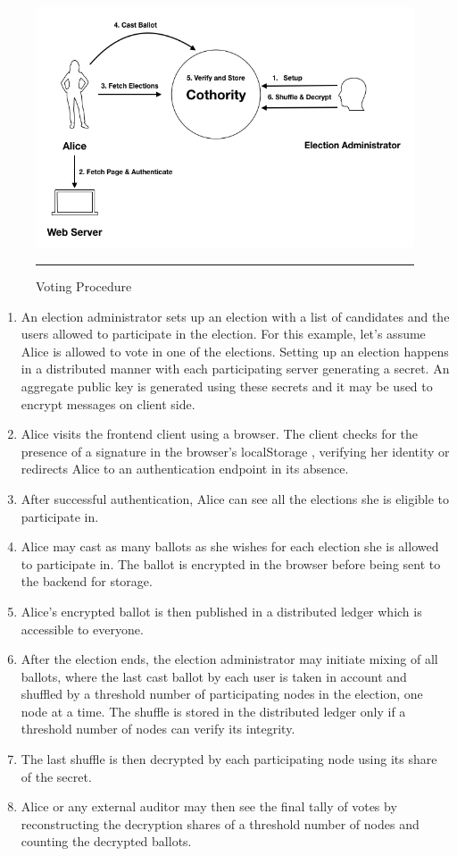 \begin{figure}[htpb]
  \centering
    \includegraphics[scale=0.4]{Figures/Overview.png}
    \rule{35em}{0.5pt}
  \caption[Voting Procedure]{Voting Procedure}
  \label{fig:Voting Procedure}
\end{figure}

\begin{enumerate}
\item An election administrator sets up an election with a list of candidates and the users allowed to participate in the election. For this example, let's assume Alice is allowed to vote in one of the elections. Setting up an election happens in a distributed manner with each participating server generating a secret. An aggregate public key is generated using these secrets and it may be used to encrypt messages on client side.
\item Alice visits the frontend client using a browser. The client checks for the presence of a signature in the browser's localStorage \cite{localStorage}, verifying her identity or redirects Alice to an authentication endpoint in its absence.
\item After successful authentication, Alice can see all the elections she is eligible to participate in.
\item Alice may cast as many ballots as she wishes for each election she is allowed to participate in. The ballot is encrypted in the browser before being sent to the backend for storage.
\item Alice's encrypted ballot is then published in a distributed ledger which is accessible to everyone.
\item After the election ends, the election administrator may initiate mixing of all ballots, where the last cast ballot by each user is taken in account and shuffled by a threshold number of participating nodes in the election, one node at a time. The shuffle is stored in the distributed ledger only if a threshold number of nodes can verify its integrity.
\item The last shuffle is then decrypted by each participating node using its share of the secret.
\item Alice or any external auditor may then see the final tally of votes by reconstructing the decryption shares of a threshold number of nodes and counting the decrypted ballots.
\end{enumerate}

